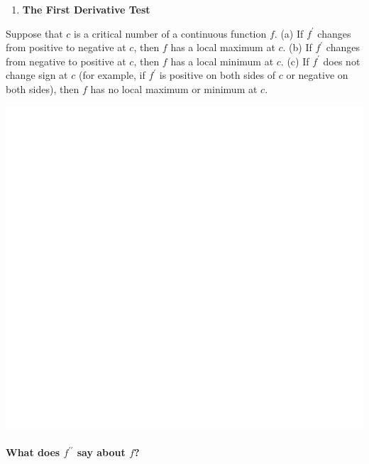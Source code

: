 \documentclass[]{book}
\providecommand{\tightlist}{%
  \setlength{\itemsep}{0pt}\setlength{\parskip}{0pt}}
\let\oldparagraph\paragraph
\renewcommand{\paragraph}[1]{\oldparagraph{#1}\mbox{}}
\begin{document}
\newpage

\begin{enumerate}
\def\labelenumi{\arabic{enumi}.}
\setcounter{enumi}{1}
\tightlist
\item
  \textbf{The First Derivative Test}
\end{enumerate}

Suppose that \(c\) is a critical number of a continuous function \(f\).
(a) If \(f^\prime\) changes from positive to negative at \(c\), then \(f\) has a local maximum at \(c\).
(b) If \(f^\prime\) changes from negative to positive at \(c\), then \(f\) has a local minimum at \(c\).
(c) If \(f^\prime\) does not change sign at \(c\) (for example, if \(f^\prime\) is positive on both sides of \(c\) or negative on both sides), then \(f\) has no local maximum or minimum at \(c\).

\begin{center}\includegraphics[width=1\linewidth]{figure/LB36-1} \end{center}

\hypertarget{what-does-fprime-prime-say-about-f}{%
\paragraph{\texorpdfstring{What does \(f^{\prime \prime}\) say about \(f\)?}{What does f\^{}\{\textbackslash{}prime \textbackslash{}prime\} say about f?}}\label{what-does-fprime-prime-say-about-f}}
\end{document}
